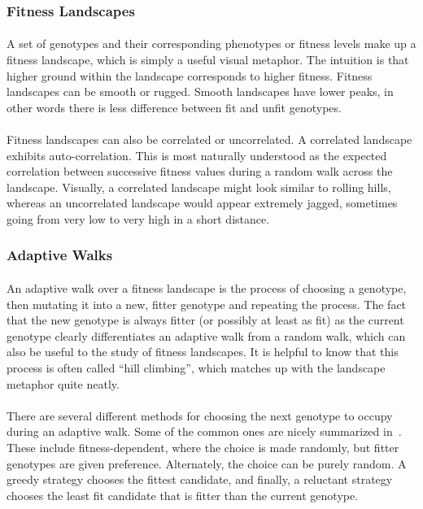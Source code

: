 \documentclass[12pt,letterpaper,titlepage,draft]{article}
\begin{document}
\subsubsection{Fitness Landscapes}

\paragraph{}
A set of genotypes and their corresponding phenotypes or fitness levels make up
a fitness landscape, which is simply a useful visual metaphor. The intuition is
that higher ground within the landscape corresponds to higher fitness. Fitness
landscapes can be smooth or rugged. Smooth landscapes have lower peaks, in
other words there is less difference between fit and unfit genotypes.

\paragraph{}
Fitness landscapes can also be correlated or uncorrelated. A correlated
landscape exhibits auto-correlation. This is most naturally understood as the
expected correlation between successive fitness values during a random walk
across the landscape. Visually, a correlated landscape might look similar to
rolling hills, whereas an uncorrelated landscape would appear extremely jagged,
sometimes going from very low to very high in a short distance.

\subsubsection{Adaptive Walks}

\paragraph{}
An adaptive walk over a fitness landscape is the process of choosing a
genotype, then mutating it into a new, fitter genotype and repeating the
process. The fact that the new genotype is always fitter (or possibly at least
as fit) as the current genotype clearly differentiates an adaptive walk from a
random walk, which can also be useful to the study of fitness landscapes. It is
helpful to know that this process is often called ``hill climbing'', which
matches up with the landscape metaphor quite neatly.

\paragraph{}
There are several different methods for choosing the next genotype to occupy
during an adaptive walk. Some of the common ones are nicely summarized
in~\cite{Nowak2015}. These include fitness-dependent, where the choice is made
randomly, but fitter genotypes are given preference. Alternately, the choice
can be purely random. A greedy strategy chooses the fittest candidate, and
finally, a reluctant strategy chooses the least fit candidate that is fitter
than the current genotype.
\end{document}
